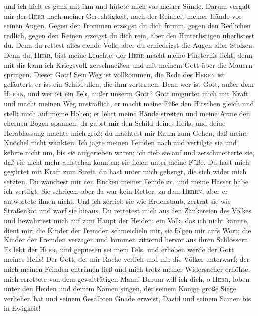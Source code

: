  und ich hielt es ganz mit ihm und hütete mich vor meiner
Sünde.  Darum vergalt mir der \textsc{Herr} nach meiner
Gerechtigkeit, nach der Reinheit meiner Hände vor seinen Augen.
 Gegen den Frommen erzeigst du dich fromm, gegen den
Redlichen redlich,  gegen den Reinen erzeigst du dich
rein, aber den Hinterlistigen überlistest du.  Denn du
rettest alles elende Volk, aber du erniedrigst die Augen aller Stolzen.
 Denn du, \textsc{Herr}, bist meine Leuchte; der
\textsc{Herr} macht meine Finsternis licht;  denn mit dir
kann ich Kriegsvolk zerschmeißen und mit meinem Gott über die Mauern
springen.  Dieser Gott! Sein Weg ist vollkommen, die Rede
des \textsc{Herrn} ist geläutert; er ist ein Schild allen, die ihm
vertrauen.  Denn wer ist Gott, außer dem \textsc{Herrn},
und wer ist ein Fels, außer unserm Gott?  Gott umgürtet
mich mit Kraft und macht meinen Weg unsträflich,  er
macht meine Füße den Hirschen gleich und stellt mich auf meine Höhen;
 er lehrt meine Hände streiten und meine Arme den ehernen
Bogen spannen;  du gabst mir den Schild deines Heils, und
deine Herablassung machte mich groß;  du machtest mir
Raum zum Gehen, daß meine Knöchel nicht wankten.  Ich
jagte meinen Feinden nach und vertilgte sie und kehrte nicht um, bis sie
aufgerieben waren;  ich rieb sie auf und zerschmetterte
sie, daß sie nicht mehr aufstehen konnten; sie fielen unter meine Füße.
 Du hast mich gegürtet mit Kraft zum Streit, du hast
unter mich gebeugt, die sich wider mich setzten.  Du
wandtest mir den Rücken meiner Feinde zu, und meine Hasser habe ich
vertilgt.  Sie schrieen, aber da war kein Retter; zu dem
\textsc{Herrn}, aber er antwortete ihnen nicht.  Und ich
zerrieb sie wie Erdenstaub, zertrat sie wie Straßenkot und warf sie
hinaus.  Du rettetest mich aus den Zänkereien des Volkes
und bewahrtest mich auf zum Haupt der Heiden; ein Volk, das ich nicht
kannte, dient mir;  die Kinder der Fremden schmeicheln
mir, sie folgen mir aufs Wort;  die Kinder der Fremden
verzagen und kommen zitternd hervor aus ihren Schlössern.
 Es lebt der \textsc{Herr}, und gepriesen sei mein Fels,
und erhoben werde der Gott meines Heils!  Der Gott, der
mir Rache verlieh und mir die Völker unterwarf;  der mich
meinen Feinden entrinnen ließ und mich trotz meiner Widersacher erhöhte,
mich errettete von dem gewalttätigen Mann!  Darum will
ich dich, o \textsc{Herr}, loben unter den Heiden und deinem Namen
singen,  der seinem Könige große Siege verliehen hat und
seinem Gesalbten Gnade erweist, David und seinem Samen bis in Ewigkeit!


